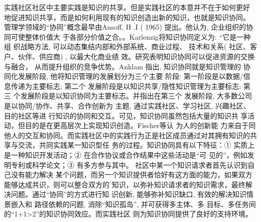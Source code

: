 \documentclass[12pt,a4paper]{ctexart}
\begin{document}
实践社区社区中主要实践是知识的共享。但是实践社区的本意并不在于如何更好
地促进知识共享，而是如何利用现有的知识创造出新的知识，也就是知识协同。
管理学领域的“协同”概念最早由Ansoff, H .I
( 1965) 提出。他认为, 企业组织的协同可使整体价值大
于各部分价值之合。\cite{Ansoff1965}。Karlenzig将知识协同定义为: “它是一种组
织战略方法, 可以动态集结内部和外部系统、商业过程、
技术和关系( 社区、客户、伙伴、供应商) , 以最大化商业绩
效\cite{karlenzig2002tip}。研究表明知识协同可以促进资源的交换与融合，
从而提升组织的竞争优势\cite{ghoshal1998sci}\cite{galunic1998rrf}。Anklam 指出, 知识协同就是知识管理的
协同化发展阶段, 他将知识管理的发展划分为三个主要
阶段: 第一阶段是以数据/信息传递为主要标志; 第二个
发展阶段是以知识共享/隐性知识管理为主要标志; 第三
个发展阶段是以知识协同为主要标志。并指出在第三个
发展阶段, 大多数公司是以协同/协作、共享、合作创新为
主题, 通过实践社区、学习社区, 兴趣社区、目的社区等进
行知识的协同和交互\cite{anklam2002kmc}。可见，知识协同虽然包括大量的知识共
享活动，但目的是在更高层次上实现知识创造\cite{Heiman2004}。Fischer等认
为人的创新能
力来自于同他人的交互和协同\cite{Fischer2005}。而实践社区中的实践行为正是社区成员通过对其拥有知识的共享与交流，共同实践某一知识型任
务的过程。知识协同具有以下特征：① 实质上是一种知识开发活动；② 在合作协议或合作结果中这些活动是“可
见的”，例如发明专利或科学论文；③ 有多方参与其中\cite{mckelvey2003dcl}。
社区中某一个知识请求者首先认识到自己没有能力解决
某个问题，而另一个知识提供者恰好有这方面的能力，如果双方能够达成共识，则可以整合双方的
知识，以弥补知识请求者的知识需求，最终解决问题\cite{Leijen2002}。通过“协同”的方式进行知
识创新, 能够弥补知识缺口, 有效的解决知识情景嵌入和
路径依赖的问题, 消除“知识孤岛”, 并可获得多主体、多
目标、多任务间的“1+1>2”的知识协同效应\cite{fanzhiping2007}。而实践社区
则为知识协同提供了良好的支持环境。
\end{document}
